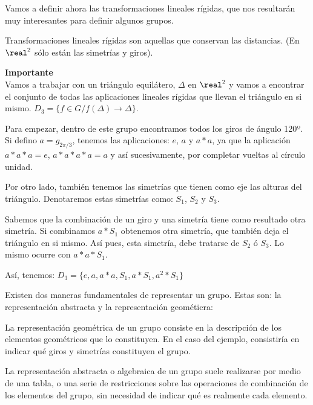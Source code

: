 \documentclass[nochap]{apuntes}
\begin{document}
Vamos a definir ahora las transformaciones lineales rígidas, que nos resultarán muy interesantes para definir algunos grupos.
\begin{defn}
Transformaciones lineales rígidas son aquellas que conservan las distancias. (En $\real^{2}$  sólo están las simetrías y giros).
\end{defn}

\begin{example}\textbf{Importante}\\
  Vamos a trabajar con un triángulo equilátero, $\Delta$  en $\real^{2}$  y vamos a encontrar el conjunto de todas las aplicaciones lineales rígidas 
  que llevan el triángulo en si mismo. $D_{3}=\{f\in G / f(\Delta)\longrightarrow\Delta\}$.

  Para empezar, dentro de este grupo encontramos todos los giros de ángulo 120º. \\
  Si defino $a=g_{2\pi/3}$, tenemos las aplicaciones: $e$, $a$  y $a\ast a$, ya que la aplicación $a\ast a\ast a=e$, $a\ast a\ast a\ast a=a$  y así sucesivamente, por completar vueltas al círculo unidad.

  Por otro lado, también tenemos las simetrías que tienen como eje las alturas del triángulo. Denotaremos estas simetrías como: $S_{1}$, $S_{2}$  y $S_{3}$.

  Sabemos que la combinación de un giro y una simetría tiene como resultado otra simetría. Si combinamos $a\ast S_{1}$  obtenemos otra simetría, que también deja el triángulo en si mismo. Así pues, esta simetría, debe tratarse de $S_{2}$  ó $S_{3}$. Lo mismo ocurre con $a\ast a\ast S_{1}$.

  Así, tenemos: $D_{3}=\{e, a, a\ast a, S_{1}, a\ast S_{1}, a^{2}\ast S_{1}\}$
\end{example}

Existen dos maneras fundamentales de representar un grupo. Estas son: la representación abstracta y la representación geométicra:
\begin{defn}
  La representación geométrica de un grupo consiste en la descripción de los elementos geométricos que lo constituyen. 
  En el caso del ejemplo, consistiría en indicar qué giros y simetrías constituyen el grupo.
\end{defn}

\begin{defn}
  La representación abstracta o algebraica de un grupo suele realizarse por medio de una tabla, o una serie de restricciones sobre las operaciones 
  de combinación de los elementos del grupo, sin necesidad de indicar qué es realmente cada elemento.
\end{defn}
\end{document}
